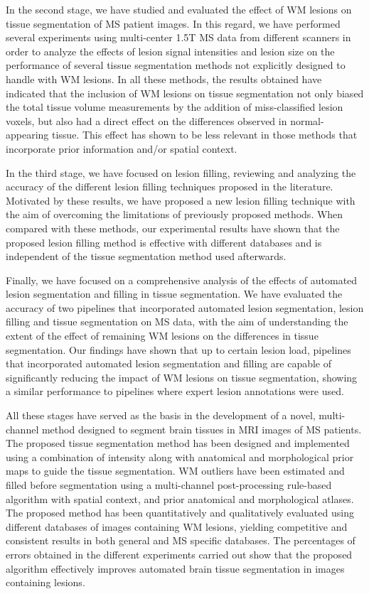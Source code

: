 In the second stage, we have studied and evaluated the effect of WM lesions on tissue segmentation of MS patient images. In this regard, we have performed several experiments using multi-center 1.5T MS data from different scanners in order to analyze the effects of lesion signal intensities and lesion size on the performance of several tissue segmentation methods not explicitly designed to handle with WM lesions. In all these methods, the results obtained have indicated that the inclusion of WM lesions on tissue segmentation not only biased the total tissue volume measurements by the addition of miss-classified lesion voxels, but also had a direct effect on the differences observed in normal-appearing tissue. This effect has shown to be less relevant in those methods that incorporate prior information and/or spatial context. 

In the third stage, we have focused on lesion filling, reviewing and analyzing the accuracy of the different lesion filling techniques proposed in the literature. Motivated by these results, we have proposed a new lesion filling technique with the aim of overcoming the limitations of previously proposed methods. When compared with these methods, our experimental results have shown that the proposed lesion filling method is effective with different databases and is independent of the tissue segmentation method used afterwards. 

Finally, we have focused on a comprehensive analysis of the effects of automated lesion segmentation and filling in tissue segmentation. We have evaluated the accuracy of two pipelines that incorporated automated lesion segmentation, lesion filling and tissue segmentation on MS data, with the aim of understanding the extent of the effect of remaining WM lesions on the differences in tissue segmentation. Our findings have shown that up to certain lesion load, pipelines that incorporated automated lesion segmentation and filling are capable of significantly reducing the impact of WM lesions on tissue segmentation, showing a similar performance to pipelines where expert lesion annotations were used.

All these stages have served as the basis in the development of a novel, multi-channel method designed to segment brain tissues in MRI images of MS patients. The proposed tissue segmentation method has been designed and implemented using a combination of intensity along with anatomical and morphological prior maps to guide the tissue segmentation. WM outliers have been estimated and filled before segmentation using a multi-channel post-processing rule-based algorithm with spatial context, and prior anatomical and morphological atlases. The proposed method has been quantitatively and qualitatively evaluated using different databases of images containing WM lesions, yielding competitive and consistent results in both general and MS specific databases. The percentages of errors obtained in the different experiments carried out show that the proposed algorithm effectively improves automated brain tissue segmentation in images containing lesions. 

